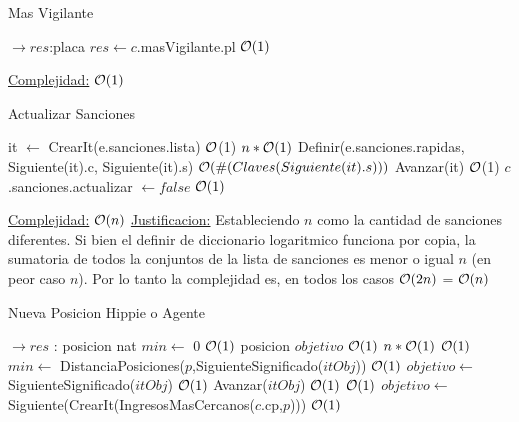 \begin{Algoritmos}
\begin{algorithm}[H]
\caption{Mas Vigilante}
\begin{algorithmic}[1]
 $\to res$:placa
	\State $res \gets c$.masVigilante.pl \Comment $\mathcal{O}(1)$
\EndProcedure
\end{algorithmic}
\underline{Complejidad:} $\mathcal{O}(1)$
\end{algorithm}


\begin{algorithm}[H]
\caption{Actualizar Sanciones}
\begin{algorithmic}[1]
	\State it $\gets$ CrearIt(e.sanciones.lista) \Comment $\mathcal{O}$(1)
	 \Comment $n*\mathcal{O}(1)$
		\State Definir(e.sanciones.rapidas, Siguiente(it).c, Siguiente(it).s) \Comment $\mathcal{O}(\#(Claves(Siguiente(it).s)))$
		\State Avanzar(it) \Comment $\mathcal{O}$(1) 
	\EndWhile
	\State $c$.sanciones.actualizar $\gets false$ \Comment $\mathcal{O}(1)$
\EndProcedure
\end{algorithmic}
\underline{Complejidad:} $\mathcal{O}(n)$
\underline{Justificacion:} Estableciendo $n$ como la cantidad de sanciones diferentes. Si bien el definir de diccionario logaritmico funciona por copia, la sumatoria de todos la conjuntos de la lista de sanciones es menor o igual $n$ (en peor caso $n$). Por lo tanto la complejidad es, en todos los casos $\mathcal{O}(2n)$ = $\mathcal{O}(n)$
\end{algorithm}



\begin{algorithm}[H]
\caption{Nueva Posicion Hippie o Agente}
\begin{algorithmic}[1]
  $\to res$ : posicion
	\State nat $min \gets$ 0 \Comment $\mathcal{O}(1)$
	\State posicion $objetivo$ \Comment $\mathcal{O}(1)$
	 \Comment $n*\mathcal{O}(1)$
		 \Comment $\mathcal{O}(1)$
			\State $min \gets$ DistanciaPosiciones($p$,SiguienteSignificado($itObj$)) \Comment $\mathcal{O}(1)$
			\State $objetivo \gets$ SiguienteSignificado($itObj$) \Comment $\mathcal{O}(1)$
		\EndIf
		\State Avanzar($itObj$) \Comment $\mathcal{O}(1)$
	\EndWhile
	 \Comment $\mathcal{O}(1)$
		\State $objetivo \gets$ Siguiente(CrearIt(IngresosMasCercanos($c$.cp,$p$)))	 \Comment $\mathcal{O}(1)$	
	\EndIf
	

\end{algorithmic}
\end{algorithm}
\end{Algoritmos}

